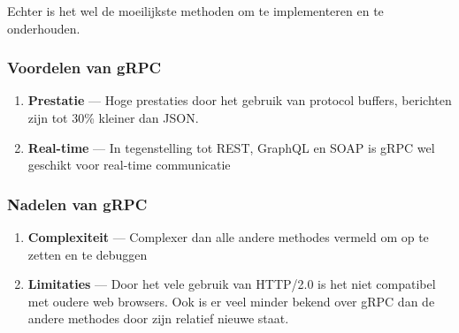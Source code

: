 Echter is het wel de moeilijkste methoden om te implementeren en te onderhouden.

\subsubsection{Voordelen van gRPC}
\begin{enumerate}
    \item \textbf{Prestatie} --- Hoge prestaties door het gebruik van protocol
     buffers, berichten zijn tot 30\% kleiner dan JSON.
    \item \textbf{Real-time} --- In tegenstelling tot REST, GraphQL en SOAP
     is gRPC wel geschikt voor real-time communicatie
\end{enumerate}

\subsubsection{Nadelen van gRPC}
\begin{enumerate}
    \item \textbf{Complexiteit} --- Complexer dan alle andere methodes vermeld
     om op te zetten en te debuggen
     \item \textbf{Limitaties} --- Door het vele gebruik van HTTP/2.0 is het niet
      compatibel met oudere web browsers. Ook is er veel minder bekend over gRPC
      dan de andere methodes door zijn relatief nieuwe staat.
\end{enumerate}
